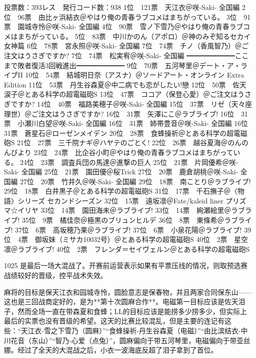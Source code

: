 	投票数：393レス　発行コード数：938
	1位　121票　天江衣＠咲-Saki- 全国編
	2位　96票　由比ヶ浜結衣＠やはり俺の青春ラブコメはまちがっている。
	3位　91票　園城寺怜＠咲-Saki- 全国編
	4位　90票　雪ノ下雪乃＠やはり俺の青春ラブコメはまちがっている。
	5位　83票　中川かのん（アポロ）＠神のみぞ知るセカイ 女神篇
	6位　78票　宮永照＠咲-Saki- 全国編
	7位　74票　チノ（香風智乃）＠ご注文はうさぎですか?
	7位　74票　松実宥＠咲-Saki- 全国編
	━━━━━━━ここまで敗者復活3回戦進出━━━━━━━
	9位　70票　五河琴里＠デート・ア・ライブII
	10位　54票　結城明日奈（アスナ）＠ソードアート・オンライン Extra Edition
	11位　53票　丹生谷森夏＠中二病でも恋がしたい!戀
	12位　50票　佐天涙子＠とある科学の超電磁砲S
	13位　47票　ココア（保登心愛）＠ご注文はうさぎですか?
	14位　40票　福路美穂子＠咲-Saki- 全国編
	15位　37票　リゼ（天々座理世）＠ご注文はうさぎですか?
	16位　31票　矢澤にこ＠ラブライブ!
	16位　31票　小瀬川白望＠咲-Saki- 全国編
	16位　31票　姉帯豊音＠咲-Saki- 全国編
	16位　31票　蒼星石＠ローゼンメイデン
	20位　28票　食蜂操祈＠とある科学の超電磁砲S
	21位　27票　三千院ナギ＠ハヤテのごとく!
	22位　26票　越谷夏海＠のんのんびより
	23位　24票　比企谷小町＠やはり俺の青春ラブコメはまちがっている。
	24位　23票　調査兵団の馬達＠進撃の巨人
	25位　21票　片岡優希＠咲-Saki- 全国編
	25位　21票　園田優＠桜Trick
	27位　20票　鹿倉胡桃＠咲-Saki- 全国編
	27位　20票　竹井久＠咲-Saki- 全国編
	29位　18票　南ことり＠ラブライブ!
	29位　18票　白井黒子＠とある科学の超電磁砲S
	31位　17票　千石撫子＠〈物語〉シリーズ セカンドシーズン
	32位　15票　遠坂凛＠Fate/kaleid liner プリズマ☆イリヤ
	33位　14票　園田海未＠ラブライブ!
	33位　14票　絢瀬絵里＠ラブライブ!
	35位　9票　橘佳奈＠極黒のブリュンヒルデ
	36位　8票　東條希＠ラブライブ!
	37位　6票　高坂穂乃果＠ラブライブ!
	37位　6票　小泉花陽＠ラブライブ!
	39位　4票　御坂妹（ミサカ10032号）＠とある科学の超電磁砲S
	40位　2票　星空凛＠ラブライブ!
	40位　2票　フレンダ＝セイヴェルン＠とある科学の超電磁砲S

1025 是最后一场大混战了。开赛前运营表示如果有平票压线的情况，则取预选赛战绩较好的晋级，控平战术失效。

麻将的目标是保天江衣和园城寺怜，圆脸意志是保春物，并且两家合同保东山——这也是三回战商定好的，是为**第十次圆麻合作**。电磁第一目标应该是佐天泪子，然而全场一直在带森夏和食蜂；LL的目标应该是能捞多少捞多少，但实际上最后的实票也没有晋级的希望。这天的比赛比较混乱，但是主要的连记有这些：“天江衣-雪之下雪乃（圆麻）”“食蜂操祈-丹生谷森夏（电磁）”“由比滨结衣-中川花音（东山）”“智乃-心爱（点兔）”，圆麻偏向于带五河琴里，电磁偏向于带亚丝娜。经过了全天的大混战之后，小衣一波海底反超了泪子拿到了首位。

